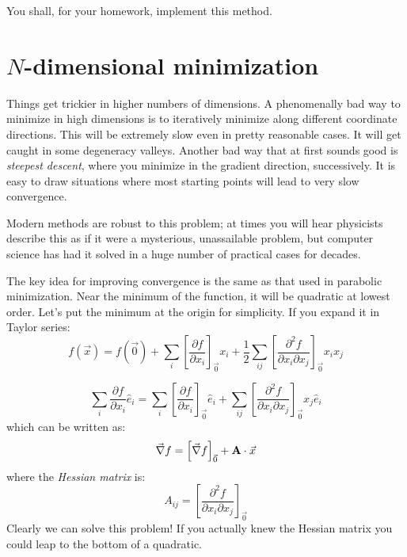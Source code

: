 You shall, for your homework, implement this method.

\section{$N$-dimensional minimization}

Things get trickier in higher numbers of dimensions. A phenomenally
bad way to minimize in high dimensions is to iteratively minimize
along different coordinate directions.  This will be extremely slow
even in pretty reasonable cases.  It will get caught in some
degeneracy valleys.  Another bad way that at first sounds good is {\it
  steepest descent}, where you minimize in the gradient direction,
successively. It is easy to draw situations where most starting
points will lead to very slow convergence.

Modern methods are robust to this problem; at times you will hear
physicists describe this as if it were a mysterious, unassailable
problem, but computer science has had it solved in a huge number of
practical cases for decades.

The key idea for improving convergence is the same as that used in
parabolic minimization. Near the minimum of the function, it will be
quadratic at lowest order. Let's put the minimum at the origin for
simplicity. If you expand it in Taylor series:
\begin{equation}
  f(\vec{x}) = f(\vec{0})
  + \sum_i \left[\frac{\partial f}{\partial x_i}\right]_{\vec{0}}  x_i
  + \frac{1}{2} \sum_{ij} \left[\frac{\partial^2 f}{\partial x_i \partial x_j}\right]_{\vec{0}}
  x_i x_j
\end{equation}


\begin{answer}
\begin{equation}
\sum_i \frac{\partial f}{\partial x_i} {\hat e}_i = \sum_i
\left[\frac{\partial f}{\partial x_i}\right]_{\vec{0}} {\hat e}_i +
\sum_{ij} \left[\frac{\partial^2 f}{\partial x_i \partial
    x_j}\right]_{\vec{0}} x_j {\hat e}_i
\end{equation}
which can be written as:
\begin{equation}
\vec{\nabla}f = \left[\vec{\nabla}f \right]_{\vec{0}} +
{\bf A}\cdot{\vec{x}}
\end{equation}
where the {\it Hessian matrix} is:
\begin{equation}
A_{ij} = 
\left[\frac{\partial^2 f}{\partial x_i \partial x_j}\right]_{\vec{0}}
\end{equation}
Clearly we can solve this problem!  If you actually knew the Hessian
matrix you could leap to the bottom of a quadratic.
\end{answer}

